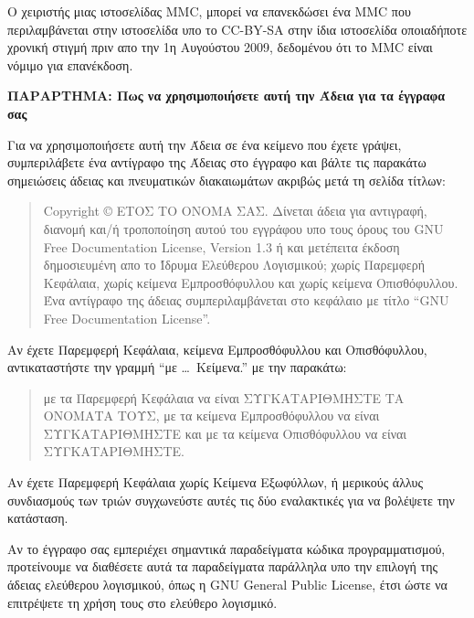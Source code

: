 Ο χειριστής μιας ιστοσελίδας MMC, μπορεί να επανεκδώσει ένα MMC που περιλαμβάνεται στην ιστοσελίδα υπο το CC-BY-SA στην ίδια ιστοσελίδα οποιαδήποτε χρονική στιγμή πριν απο την 1η Αυγούστου 2009, δεδομένου ότι το MMC είναι νόμιμο για επανέκδοση.


\begin{center}
{\Large\bf ΠΑΡΑΡΤΗΜΑ: Πως να χρησιμοποιήσετε αυτή την Άδεια για τα έγγραφα σας\par}
\end{center}

Για να χρησιμοποιήσετε αυτή την Άδεια σε ένα κείμενο που έχετε γράψει, συμπεριλάβετε ένα αντίγραφο της Άδειας στο έγγραφο και βάλτε τις παρακάτω σημειώσεις άδειας και πνευματικών διακαιωμάτων ακριβώς μετά τη σελίδα τίτλων:

\bigskip
\begin{quote}
    Copyright \copyright{}  ΕΤΟΣ ΤΟ ΟΝΟΜΑ ΣΑΣ.
    Δίνεται άδεια για αντιγραφή, διανομή και/ή τροποποίηση αυτού του εγγράφου υπο τους όρους του GNU Free Documentation License, Version 1.3 ή και μετέπειτα έκδοση δημοσιευμένη απο το Ίδρυμα Ελεύθερου Λογισμικού; χωρίς Παρεμφερή Κεφάλαια, χωρίς κείμενα Εμπροσθόφυλλου και χωρίς κείμενα Οπισθόφυλλου. Ένα αντίγραφο της άδειας συμπεριλαμβάνεται στο κεφάλαιο με τίτλο “GNU Free Documentation License”. 
\end{quote}
\bigskip
    
Αν έχετε Παρεμφερή Κεφάλαια, κείμενα Εμπροσθόφυλλου και Οπισθόφυλλου, αντικαταστήστε την γραμμή ``με \dots\ Κείμενα.'' με την παρακάτω:

\bigskip
\begin{quote}
    με τα Παρεμφερή Κεφάλαια να είναι ΣΥΓΚΑΤΑΡΙΘΜΗΣΤΕ ΤΑ ΟΝΟΜΑΤΑ ΤΟΥΣ, με τα κείμενα Εμπροσθόφυλλου να είναι ΣΥΓΚΑΤΑΡΙΘΜΗΣΤΕ και με τα κείμενα Οπισθόφυλλου να είναι ΣΥΓΚΑΤΑΡΙΘΜΗΣΤΕ.
\end{quote}
\bigskip
    
Αν έχετε Παρεμφερή Κεφάλαια χωρίς Κείμενα Εξωφύλλων, ή μερικούς άλλυς συνδιασμούς των τριών συγχωνεύστε αυτές τις δύο εναλακτικές για να βολέψετε την κατάσταση.

Αν το έγγραφο σας εμπεριέχει σημαντικά παραδείγματα κώδικα προγραμματισμού, προτείνουμε να διαθέσετε αυτά τα παραδείγματα παράλληλα υπο την επιλογή της άδειας ελεύθερου λογισμικού, όπως η GNU General Public License, έτσι ώστε να επιτρέψετε τη χρήση τους στο ελεύθερο λογισμικό.

